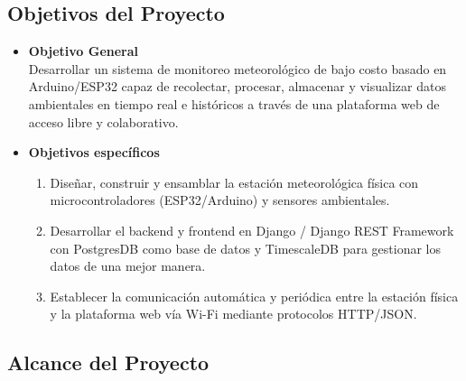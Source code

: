 \subsection{Objetivos del Proyecto}
\begin{itemize}
    \item \textbf{Objetivo General}\\
    Desarrollar un sistema de monitoreo meteorológico de bajo costo basado en Arduino/ESP32 capaz de recolectar, procesar, almacenar y visualizar datos ambientales en tiempo real e históricos a través de una plataforma web de acceso libre y colaborativo. 
 
    \item \textbf{Objetivos específicos}
    \begin{enumerate}
        \item Diseñar, construir y ensamblar la estación meteorológica física con microcontroladores (ESP32/Arduino) y sensores ambientales.
        \item Desarrollar el backend y frontend en Django / Django REST Framework con PostgresDB como base de datos y TimescaleDB para gestionar los datos de una mejor manera.
        \item Establecer la comunicación automática y periódica entre la estación física y la plataforma web vía Wi-Fi mediante protocolos HTTP/JSON. 
    \end{enumerate}
\end{itemize}

\subsection{Alcance del Proyecto}

